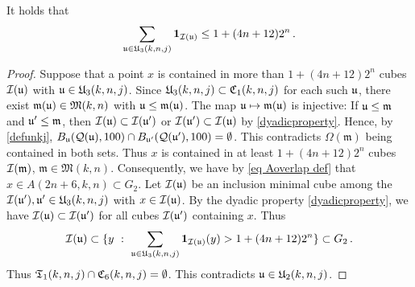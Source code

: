 {\begin{lemma}
    \label{forest stacking}
    It holds that
    \begin{equation}
        \sum_{\fu \in \fU_3(k,n,j)} \mathbf{1}_{\sc(\fu)} \le 1 + (4n+12)2^{n}\,.
    \end{equation}
\end{lemma}

\begin{proof}
    Suppose that a point $x$ is contained in more than $1 + (4n + 12)2^n$ cubes $\sc(\fu)$ with $\fu \in \fU_3(k,n,j)$. Since $\fU_3(k,n,j) \subset \fC_1(k,n,j)$ for each such $\fu$, there exist $\mathfrak{m}(\fu) \in \mathfrak{M}(k,n)$ with $\fu \le \mathfrak{m}(\fu)$. The map $\fu \mapsto\mathfrak{m}(\fu)$ is injective: If $\fu \le \mathfrak{m}$ and $\fu' \le \mathfrak{m}$, then $\sc(\fu) \subset \sc(\fu')$ or $\sc(\fu') \subset \sc(\fu)$ by \eqref{dyadicproperty}. Hence, by \eqref{defunkj}, $B_{\fu}(\fcc(\fu),100) \cap B_{\fu'}(\fcc(\fu'), 100) = \emptyset$. This contradicts $\Omega(\mathfrak{m})$ being contained in both sets. Thus $x$ is contained in at least $1 + (4n + 12)2^n$ cubes $\sc(\mathfrak{m})$, $\mathfrak{m} \in \mathfrak{M}(k,n)$. Consequently, we have by \eqref{eq Aoverlap def} that $x \in A(2n + 6, k,n) \subset G_2$. Let $\sc(\fu)$ be an inclusion minimal cube among the $\sc(\fu'), \fu' \in \fU_3(k,n,j)$ with $x \in \sc(\fu)$. By the dyadic property \eqref{dyadicproperty}, we have $\sc(\fu) \subset \sc(\fu')$ for all cubes $\sc(\fu')$ containing $x$. Thus
    $$
        \sc(\fu) \subset \{y \ : \ \sum_{\fu \in \fU_3(k,n,j)} \mathbf{1}_{\sc(\fu)}(y) > 1 + (4n+12)2^{n}\} \subset G_2\,.
    $$
    Thus $\mathfrak{T}_1(k,n,j) \cap \fC_6(k,n,j) = \emptyset$.
    This contradicts $\fu \in \fU_2(k,n,j)$.
\end{proof}

}
